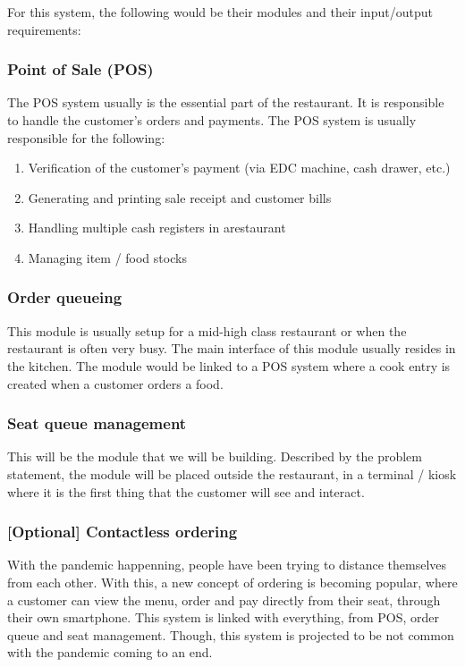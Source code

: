 \documentclass[
  11pt, %
]{assignment}
\begin{document}
For this system, the following would be their modules and their input/output requirements:

\subsubsection*{Point of Sale (POS)}

The POS system usually is the essential part of the restaurant. It is responsible to handle the customer's orders and payments. The POS system is usually responsible for the following:

\begin{enumerate}
  \item Verification of the customer's payment (via EDC machine, cash drawer, etc.)
  \item Generating and printing sale receipt and customer bills
  \item Handling multiple cash registers in arestaurant
  \item Managing item / food stocks
\end{enumerate}

\subsubsection*{Order queueing}

This module is usually setup for a mid-high class restaurant or when the restaurant is often very busy. The main interface of this module usually resides in the kitchen. The module would be linked to a POS system where a cook entry is created when a customer orders a food.

\subsubsection*{Seat queue management}

This will be the module that we will be building. Described by the problem statement, the module will be placed outside the restaurant, in a terminal / kiosk where it is the first thing that the customer will see and interact.

\subsubsection*{[Optional] Contactless ordering}

With the pandemic happenning, people have been trying to distance themselves from each other. With this, a new concept of ordering is becoming popular, where a customer can view the menu, order and pay directly from their seat, through their own smartphone. This system is linked with everything, from POS, order queue and seat management. Though, this system is projected to be not common with the pandemic coming to an end.
\end{document}

